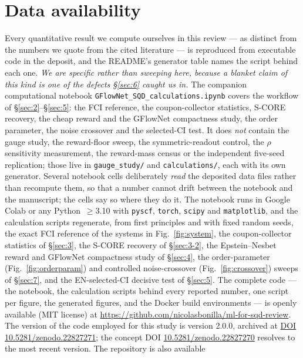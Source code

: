 \documentclass[onecolumn,a4paper]{quantumarticle}
\begin{document}
\section*{Data availability}
\small
Every quantitative result we compute ourselves in this review --- as distinct from the numbers we quote from the cited literature --- is reproduced from executable code in the deposit, and the README's generator table names the script behind each one. \emph{We are specific rather than sweeping here, because a blanket claim of this kind is one of the defects \S\ref{sec:6} caught us in.} The companion computational notebook \texttt{GFlowNet\_SQD\_calculations.ipynb} covers the workflow of \S\ref{sec:2}--\S\ref{sec:5}: the FCI reference, the coupon-collector statistics, S-CORE recovery, the cheap reward and the GFlowNet compactness study, the order parameter, the noise crossover and the selected-CI test. It does \emph{not} contain the gauge study, the reward-floor sweep, the symmetric-readout control, the $\rho$ sensitivity measurement, the reward-mass census or the independent five-seed replication; those live in \texttt{gauge\_study/} and \texttt{calculations/}, each with its own generator. Several notebook cells deliberately \emph{read} the deposited data files rather than recompute them, so that a number cannot drift between the notebook and the manuscript; the cells say so where they do it. The notebook runs in Google Colab or any Python~$\ge$3.10 with \texttt{pyscf}, \texttt{torch}, \texttt{scipy} and \texttt{matplotlib}, and the calculation scripts regenerate, from first
principles and with fixed random seeds, the exact FCI reference of the systems in Fig.~\ref{fig:system}, the coupon-collector
statistics of \S\ref{sec:3}, the S-CORE recovery of \S\ref{sec:3-2}, the Epstein--Nesbet reward and GFlowNet compactness study of
\S\ref{sec:4}, the order-parameter (Fig.~\ref{fig:orderparam}) and controlled noise-crossover (Fig.~\ref{fig:crossover}) sweeps of \S\ref{sec:7}, and the EN-selected-CI decisive test of \S\ref{sec:5}. The complete code --- the notebook,
the calculation scripts behind every reported number, one script per figure, the generated figures, and the
Docker build environments --- is openly available (MIT license) at \url{https://github.com/nicolasbonilla/ml-for-sqd-review}. The version of the code employed for this study is version 2.0.0, archived at \href{https://doi.org/10.5281/zenodo.22827271}{DOI 10.5281/zenodo.22827271}; the concept DOI \href{https://doi.org/10.5281/zenodo.22827270}{10.5281/zenodo.22827270} resolves to the most recent version. The repository is also available
\end{document}
